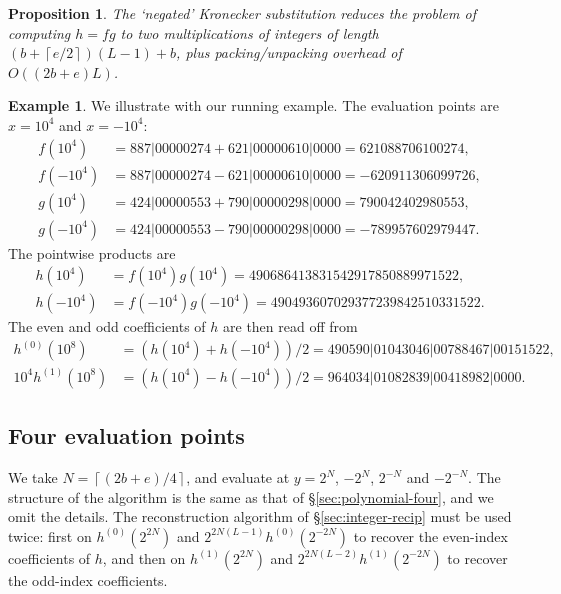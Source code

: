 \documentclass{amsart}
\newcommand{\ceil}[1]{\left\lceil{#1}\right\rceil}
\newtheorem{prop}[thm]{Proposition}
\theoremstyle{definition}
\newtheorem{example}[thm]{Example}
\theoremstyle{remark}
\begin{document}
\begin{prop}
\label{prop:integer-negate-ks}
The `negated' Kronecker substitution reduces the problem of computing $h = fg$ to two multiplications of integers of length $(b + \ceil{e/2})(L-1) + b$, plus packing/unpacking overhead of $O((2b+e)L)$.
\end{prop}

\begin{example}
We illustrate with our running example. The evaluation points are $x = 10^4$ and $x = -10^4$:
\begin{align*}
  f(10^4) & = 887|00000274 + 621|00000610|0000 = 621088706100274, \\
  f(-10^4) & = 887|00000274 - 621|00000610|0000 = -620911306099726, \\
  g(10^4) & = 424|00000553 + 790|00000298|0000 = 790042402980553, \\
  g(-10^4) & = 424|00000553 - 790|00000298|0000 = -789957602979447.
\end{align*}
The pointwise products are
\begin{align*}
  h(10^4) & = f(10^4) g(10^4) = 490686413831542917850889971522, \\
  h(-10^4) & = f(-10^4) g(-10^4) = 490493607029377239842510331522.
\end{align*}
The even and odd coefficients of $h$ are then read off from
\begin{align*}
  h^{(0)}(10^8) & = (h(10^4) + h(-10^4))/2 = 490590|01043046|00788467|00151522, \\
  10^4 h^{(1)}(10^8) & = (h(10^4) - h(-10^4))/2 = 964034|01082839|00418982|0000.
\end{align*}
\end{example}


\subsection{Four evaluation points}
\label{sec:integer-four}

We take $N = \ceil{(2b+e)/4}$, and evaluate at $y = 2^N$, $-2^N$, $2^{-N}$ and $-2^{-N}$. The structure of the algorithm is the same as that of \S\ref{sec:polynomial-four}, and we omit the details. The reconstruction algorithm of \S\ref{sec:integer-recip} must be used twice: first on $h^{(0)}(2^{2N})$ and $2^{2N(L - 1)} h^{(0)}(2^{-2N})$ to recover the even-index coefficients of $h$, and then on $h^{(1)}(2^{2N})$ and $2^{2N(L - 2)} h^{(1)}(2^{-2N})$ to recover the odd-index coefficients.
\end{document}

